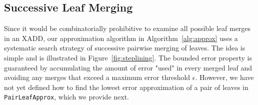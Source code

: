 \subsection{Successive Leaf Merging}


Since it would be combinatorially prohibitive to examine all possible
leaf merges in an XADD, our approximation algorithm in
Algorithm~\ref{alg:approx} uses a systematic search strategy of successive
pairwise merging of leaves. The idea is simple and is illustrated
in Figure~\ref{fig:steplining}. The bounded error property is
guaranteed by accumulating the amount of error "used" in every merged
leaf and avoiding any merges that exceed a maximum error threshold $\epsilon$.
However, we have not yet defined how to find the lowest error approximation
of a pair of leaves in \texttt{PairLeafApprox}, which we provide next.

